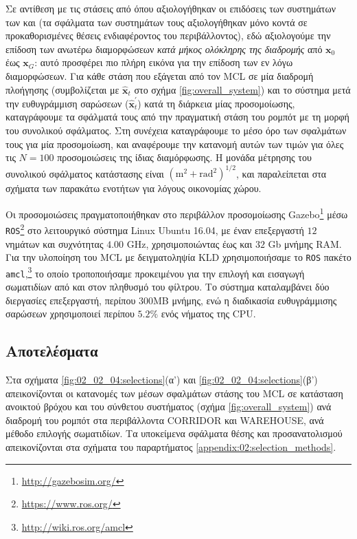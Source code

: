 Σε αντίθεση με τις στάσεις από όπου αξιολογήθηκαν οι επιδόσεις των συστημάτων
των \cite{Rowekamper2012a} και \cite{Vasiljevic2016a} (τα σφάλματα των
συστημάτων τους αξιολογήθηκαν μόνο κοντά σε προκαθορισμένες θέσεις
ενδιαφέροντος του περιβάλλοντος), εδώ αξιολογούμε την επίδοση των ανωτέρω
διαμορφώσεων \textit{κατά μήκος ολόκληρης της διαδρομής} από $\bm{x}_0$ έως
$\bm{x}_G$: αυτό προσφέρει πιο πλήρη εικόνα για την επίδοση των εν λόγω
διαμορφώσεων.  Για κάθε στάση που εξάγεται από τον MCL σε μία διαδρομή
πλοήγησης (συμβολίζεται με $\hat{\bm{x}}_t$ στο σχήμα \ref{fig:overall_system})
και το σύστημα μετά την ευθυγράμμιση σαρώσεων ($\hat{\bm{x}}^{\prime}_t$) κατά
τη διάρκεια μίας προσομοίωσης, καταγράφουμε τα σφάλματά τους από την πραγματική
στάση του ρομπότ με τη μορφή του συνολικού σφάλματος. Στη συνέχεια καταγράφουμε
το μέσο όρο των σφαλμάτων τους για μία προσομοίωση, και αναφέρουμε την κατανομή
αυτών των τιμών για όλες τις $N = 100$ προσομοιώσεις της ίδιας διαμόρφωσης. Η
μονάδα μέτρησης του συνολικού σφάλματος κατάστασης είναι
$(\text{m}^2+\text{rad}^2)^{1/2}$, και παραλείπεται στα σχήματα των παρακάτω
ενοτήτων για λόγους οικονομίας χώρου.

Οι προσομοιώσεις πραγματοποιήθηκαν στο περιβάλλον προσομοίωσης
Gazebo\footnote{\url{http://gazebosim.org/}} μέσω
\texttt{ROS}\footnote{\url{https://www.ros.org/}} στο λειτουργικό σύστημα Linux
Ubuntu 16.04, με έναν επεξεργαστή $12$ νημάτων και συχνότητας $4.00$ GHz,
χρησιμοποιώντας έως και $32$ Gb μνήμης RAM. Για την υλοποίηση του MCL με
δειγματοληψία KLD χρησιμοποιήσαμε το \texttt{ROS} πακέτο
\texttt{amcl},\footnote{\url{http://wiki.ros.org/amcl}} το οποίο τροποποιήσαμε
προκειμένου για την επιλογή και εισαγωγή σωματιδίων από και στον πληθυσμό του
φίλτρου. Το σύστημα καταλαμβάνει δύο διεργασίες επεξεργαστή, περίπου 300MB
μνήμης, ενώ η διαδικασία ευθυγράμμισης σαρώσεων χρησιμοποιεί περίπου $5.2\%$
ενός νήματος της CPU.


\subsection{Αποτελέσματα}
\label{subsection:02_02_04:02}

Στα σχήματα \ref{fig:02_02_04:selections}(α') και
\ref{fig:02_02_04:selections}(β') απεικονίζονται οι κατανομές των μέσων
σφαλμάτων στάσης του MCL σε κατάσταση ανοικτού βρόχου και του σύνθετου
συστήματος (σχήμα \ref{fig:overall_system}) ανά διαδρομή του ρομπότ στα
περιβάλλοντα CORRIDOR και WAREHOUSE, ανά μέθοδο επιλογής σωματιδίων. Τα
υποκείμενα σφάλματα θέσης και προσανατολισμού απεικονίζονται στα σχήματα του
παραρτήματος \ref{appendix:02:selection_methods}.


